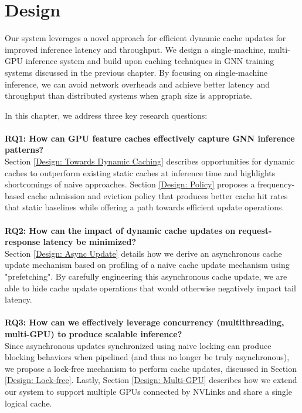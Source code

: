 \chapter{Design}
Our system leverages a novel approach for efficient dynamic cache updates for improved inference latency and throughput.
We design a single-machine, multi-GPU inference system and build upon caching techniques in GNN training systems discussed in the previous chapter. 
By focusing on single-machine inference, we can avoid network overheads and achieve better latency and throughput than distributed systems when graph size is appropriate.

In this chapter, we address three key research questions:
\\ \\
\noindent \textbf{RQ1: How can GPU feature caches effectively capture GNN inference patterns?} \\
Section \ref{Design: Towards Dynamic Caching} describes opportunities for dynamic caches to outperform existing static caches at inference time and highlights shortcomings of naive approaches. Section \ref{Design: Policy} proposes a frequency-based cache admission and eviction policy that produces better cache hit rates that static baselines while offering a path towards efficient update operations.
\\ \\
\noindent \textbf{RQ2: How can the impact of dynamic cache updates on request-response latency be minimized?} \\
Section \ref{Design: Async Update} details how we derive an asynchronous cache update mechanism based on profiling of a naive cache update mechanism using "prefetching". By carefully engineering this asynchronous cache update, we are able to hide cache update operations that would otherwise negatively impact tail latency.
\\ \\
\noindent \textbf{RQ3: How can we effectively leverage concurrency (multithreading, multi-GPU) to produce scalable inference?} \\
Since asynchronous updates synchronized using naive locking can produce blocking behaviors when pipelined (and thus no longer be truly asynchronous), we propose a lock-free mechanism to perform cache updates, discussed in Section \ref{Design: Lock-free}.
Lastly, Section \ref{Design: Multi-GPU} describes how we extend our system to support multiple GPUs connected by NVLinks and share a single logical cache.

